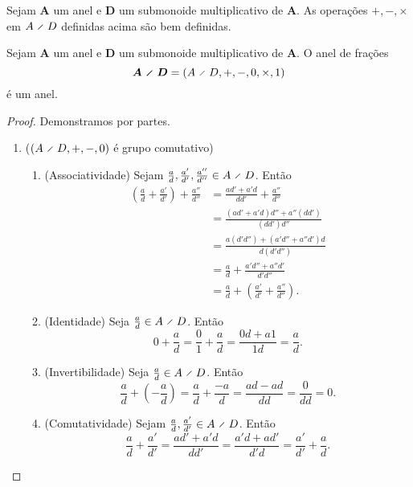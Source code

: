\begin{exercise}
Sejam $\bm A$ um anel e $\bm D$ um submonoide multiplicativo de $\bm A$. As operações $+,-,\times$ em $A \olddiv D$ definidas acima são bem definidas.
\end{exercise}

\begin{proposition}
Sejam $\bm A$ um anel e $\bm D$ um submonoide multiplicativo de $\bm A$.  O anel de frações
	\begin{equation*}
	\bm{A \olddiv D} = (A \olddiv D,+,-,0,\times,1)
	\end{equation*}
é um anel.
\end{proposition}
\begin{proof} Demonstramos por partes.
	\begin{enumerate}
	\item ($(A \olddiv D,+,-,0)$ é grupo comutativo)
		\begin{enumerate}
		\item (Associatividade) Sejam $\frac{a}{d},\frac{a'}{d'},\frac{a''}{d''} \in A \olddiv D$. Então
			\begin{align*}
			\left( \frac{a}{d} + \frac{a'}{d'} \right) + \frac{a''}{d''} &= \frac{ad'+a'd}{dd'} + \frac{a''}{d''} \\
			&=  \frac{(ad'+a'd)d''+a''(dd')}{(dd')d''} \\
			&=  \frac{a(d'd'')+(a'd''+a''d')d}{d(d'd'')} \\
			&= \frac{a}{d} + \frac{a'd''+a''d'}{d'd''} \\
			&= \frac{a}{d} + \left( \frac{a'}{d'} + \frac{a''}{d''}  \right).
			\end{align*}
		
		\item (Identidade) Seja $\frac{a}{d} \in A \olddiv D$. Então
			\begin{equation*}
			0 + \frac{a}{d} = \frac{0}{1} + \frac{a}{d} = \frac{0d+a1}{1d} = \frac{a}{d}.
			\end{equation*}
		
		\item (Invertibilidade) Seja $\frac{a}{d} \in A \olddiv D$. Então
			\begin{equation*}
			\frac{a}{d} + (- \frac{a}{d}) = \frac{a}{d} + \frac{-a}{d} = \frac{ad-ad}{dd} = \frac{0}{dd} = 0.
			\end{equation*}
		
		\item (Comutatividade) Sejam $\frac{a}{d},\frac{a'}{d'} \in A \olddiv D$. Então
			\begin{equation*}
			\frac{a}{d} + \frac{a'}{d'}= \frac{ad'+a'd}{dd'} = \frac{a'd+ad'}{d'd} = \frac{a'}{d'} + \frac{a}{d}.
			\end{equation*}
		\end{enumerate}
	

\end{enumerate}
\end{proof}
